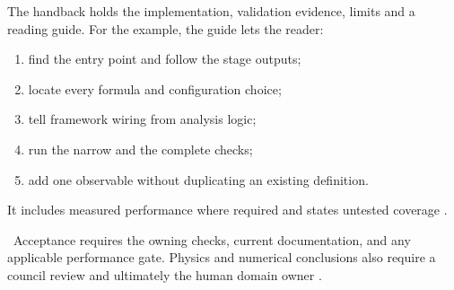 The handback holds the implementation, validation evidence, limits and a reading guide.
For the example, the guide lets the reader:
\begin{enumerate}
  \item find the entry point and follow the stage outputs;
  \item locate every formula and configuration choice;
  \item tell framework wiring from analysis logic;
  \item run the narrow and the complete checks;
  \item add one observable without duplicating an existing definition.
\end{enumerate}
It includes measured performance where required and states untested coverage \cite[Verify
  and hand back]{skill:coding}.

\review\ Acceptance requires the owning checks, current documentation, and
any applicable performance gate. Physics and numerical conclusions also require
a council review and ultimately the human domain owner
\cites[Verify and hand back]{skill:coding}[Rounds]{skill:council}.
